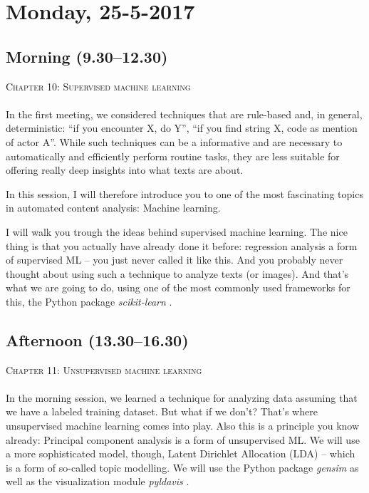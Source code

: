 \documentclass[a4paper,12pt]{report}
\begin{document}
\section*{Monday, 25-5-2017}
\subsection*{Morning (9.30--12.30)}
\textsc{ Chapter 10: Supervised machine learning}\\
~\\
In the first meeting, we considered techniques that are rule-based and, in general, deterministic: ``if you encounter X, do Y'', ``if you find string X, code as mention of actor A''. While such techniques can be a informative and are necessary to automatically and efficiently perform routine tasks, they are less suitable for offering really deep insights into what texts are about.

In this session, I will therefore introduce you to one of the most fascinating topics in automated content analysis: Machine learning. 

I will walk you trough the ideas behind supervised machine learning. The nice thing is that you actually have already done it before: regression analysis a form of supervised ML -- you just never called it like this. And you probably never thought about using such a technique to analyze texts (or images). And that's what we are going to do, using one of the most commonly used frameworks for this, the Python package \emph{scikit-learn} \citep{scikit-learn}.

\subsection*{Afternoon (13.30--16.30)}
\textsc{ Chapter 11: Unsupervised machine learning}\\
~\\
In the morning session, we learned a technique for analyzing data assuming that we have a labeled training dataset. But what if we don't? That's where unsupervised machine learning comes into play. Also this is a principle you know already: Principal component analysis is a form of unsupervised ML. We will use a more sophisticated model, though, Latent Dirichlet Allocation (LDA) -- which is a form of so-called topic modelling. We will use the Python package \emph{gensim} \citep{Rehurek2010} as well as the visualization module \emph{pyldavis} \citep{Sievert2014}.
\end{document}

